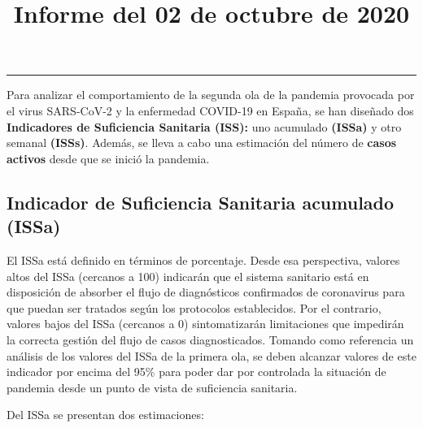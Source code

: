 \documentclass[
  11pt,
]{article}
\title{Informe del 02 de octubre de 2020}
\author{}
\date{\vspace{-2.5em}}
\begin{document}
\maketitle

\renewcommand{\figurename}{Figura}
\renewcommand{\tablename}{Tabla}

\tableofcontents

\vspace{.5cm}

\begin{center}\rule{0.5\linewidth}{0.5pt}\end{center}

\vspace{.5cm}

Para analizar el comportamiento de la segunda ola de la pandemia
provocada por el virus SARS-CoV-2 y la enfermedad COVID-19 en España, se
han diseñado dos \textbf{Indicadores de Suficiencia Sanitaria (ISS):}
uno acumulado \textbf{(ISSa)} y otro semanal \textbf{(ISSs)}. Además, se
lleva a cabo una estimación del número de \textbf{casos activos} desde
que se inició la pandemia.

\hypertarget{indicador-de-suficiencia-sanitaria-acumulado-issa}{%
\subsection{Indicador de Suficiencia Sanitaria acumulado
(ISSa)}\label{indicador-de-suficiencia-sanitaria-acumulado-issa}}

El ISSa está definido en términos de porcentaje. Desde esa perspectiva,
valores altos del ISSa (cercanos a 100) indicarán que el sistema
sanitario está en disposición de absorber el flujo de diagnósticos
confirmados de coronavirus para que puedan ser tratados según los
protocolos establecidos. Por el contrario, valores bajos del ISSa
(cercanos a 0) sintomatizarán limitaciones que impedirán la correcta
gestión del flujo de casos diagnosticados. Tomando como referencia un
análisis de los valores del ISSa de la primera ola, se deben alcanzar
valores de este indicador por encima del 95\% para poder dar por
controlada la situación de pandemia desde un punto de vista de
suficiencia sanitaria.

Del ISSa se presentan dos estimaciones:
\end{document}
